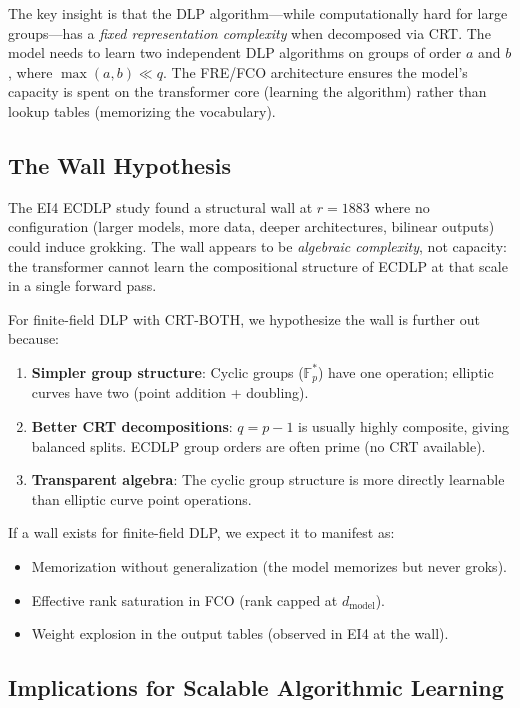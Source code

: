 \documentclass[11pt]{article}
\newcommand{\Fps}{\mathbb{F}_p^*}
\newcommand{\dmodel}{d_{\mathrm{model}}}
\begin{document}
The key insight is that the DLP algorithm---while computationally hard for large groups---has a \emph{fixed representation complexity} when decomposed via CRT. The model needs to learn two independent DLP algorithms on groups of order $a$ and $b$, where $\max(a, b) \ll q$. The FRE/FCO architecture ensures the model's capacity is spent on the transformer core (learning the algorithm) rather than lookup tables (memorizing the vocabulary).

\subsection{The Wall Hypothesis}

The EI4 ECDLP study \citep{svensson2026ecdlp} found a structural wall at $r = 1883$ where no configuration (larger models, more data, deeper architectures, bilinear outputs) could induce grokking. The wall appears to be \emph{algebraic complexity}, not capacity: the transformer cannot learn the compositional structure of ECDLP at that scale in a single forward pass.

For finite-field DLP with CRT-BOTH, we hypothesize the wall is further out because:
\begin{enumerate}[leftmargin=*]
    \item \textbf{Simpler group structure}: Cyclic groups ($\Fps$) have one operation; elliptic curves have two (point addition + doubling).
    \item \textbf{Better CRT decompositions}: $q = p - 1$ is usually highly composite, giving balanced splits. ECDLP group orders are often prime (no CRT available).
    \item \textbf{Transparent algebra}: The cyclic group structure is more directly learnable than elliptic curve point operations.
\end{enumerate}

If a wall exists for finite-field DLP, we expect it to manifest as:
\begin{itemize}[leftmargin=*]
    \item Memorization without generalization (the model memorizes but never groks).
    \item Effective rank saturation in FCO (rank capped at $\dmodel$).
    \item Weight explosion in the output tables (observed in EI4 at the wall).
\end{itemize}

\subsection{Implications for Scalable Algorithmic Learning}
\end{document}

